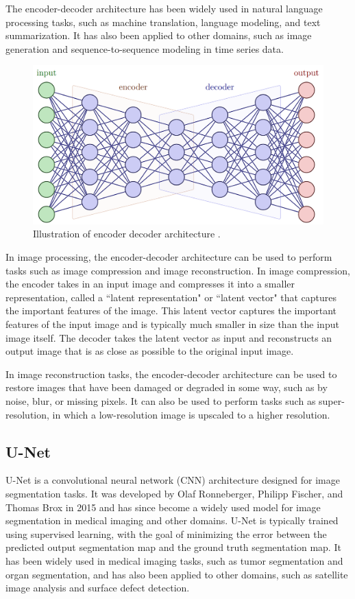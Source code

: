 \documentclass{book}
\begin{document}
	The encoder-decoder architecture has been widely used in natural language processing tasks, such as machine translation, language modeling, and text summarization. It has also been applied to other domains, such as image generation and sequence-to-sequence modeling in time series data.
	
	\begin{figure}[h!]
		\centering
		\includegraphics[width=0.7\columnwidth]{resources/chapter3/encoderdecoder.png}
		\caption{Illustration of encoder decoder architecture \cite{tikz_neural_networks}.}
		\label{fig:Encoder Decoder architecture}
	\end{figure}
	
	In image processing, the encoder-decoder architecture can be used to perform tasks such as image compression and image reconstruction.	In image compression, the encoder takes in an input image and compresses it into a smaller representation, called a ``latent representation" or ``latent vector" that captures the important features of the image. This latent vector captures the important features of the input image and is typically much smaller in size than the input image itself. The decoder takes the latent vector as input and reconstructs an output image that is as close as possible to the original input image.
	
	In image reconstruction tasks, the encoder-decoder architecture can be used to restore images that have been damaged or degraded in some way, such as by noise, blur, or missing pixels. It can also be used to perform tasks such as super-resolution, in which a low-resolution image is upscaled to a higher resolution.
	
	\subsection{U-Net}\label{subsec:unet}
	U-Net is a convolutional neural network (CNN) architecture designed for image segmentation tasks. It was developed by Olaf Ronneberger, Philipp Fischer, and Thomas Brox in 2015 \cite{UNet} and has since become a widely used model for image segmentation in medical imaging and other domains. U-Net is typically trained using supervised learning, with the goal of minimizing the error between the predicted output segmentation map and the ground truth segmentation map. It has been widely used in medical imaging tasks, such as tumor segmentation and organ segmentation, and has also been applied to other domains, such as satellite image analysis and surface defect detection.
	
\end{document}

